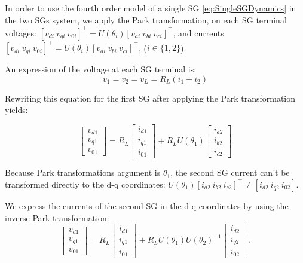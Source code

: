 \documentclass[letterpaper, 10 pt, conference]{ieeeconf}  %
\newcommand{\BE}{\begin{equation}}
\newcommand{\BEQ}[1]{\BE\label{#1}} %
\begin{document}

In order to use the fourth order model of a single SG \eqref{eq:SingleSGDynamics} in the two SGs system, we apply  the Park transformation, on each SG  terminal voltages: $\left[ v_{di}\ v_{qi}\  v_{0i} \right]^\top=U(\theta_{i})\left[v_{ai}\ v_{bi}\ v_{ci}  \right]^\top$,  and currents $\left[v_{di}\ v_{qi}\  v_{0i} \right]^\top=U(\theta_{i})\left[v_{ai}\ v_{bi}\ v_{ci}  \right]^\top$,  ($i \in \{1,2\}$).

An expression of the voltage at each SG terminal is:
$$v_1=v_2=v_L=R_{L}(i_{1}+i_{2})$$

Rewriting this equation for the first SG after applying the Park transformation yields:

$$
\left[\begin{array}{c}
v_{d1}\\
v_{q1}\\
v_{01}
\end{array}\right]=R_{L}\left[\begin{array}{c}
i_{d1}\\
i_{q1}\\
i_{01}
\end{array}\right]+R_{L}U(\theta_{1})\left[\begin{array}{c}
i_{a2}\\
i_{b2}\\
i_{c2}
\end{array}\right]
$$

Because Park transformations argument is  $\theta_1$,  the second SG current can't be transformed directly to the d-q coordinates:   $U(\theta_{1})\left[ i_{a2}\ i_{b2}\ i_{c2}\right]^\top \neq \left[ i_{d2}\ i_{q2}\ i_{02}\right]$. 

We express  the currents of the second SG in the d-q coordinates by using the inverse Park transformation: 
\BEQ{eq:TICSGVolAndCurr}
 \left[\begin{array}{c}
v_{d1}\\
v_{q1}\\
v_{01}
\end{array}\right]=R_{L}\left[\begin{array}{c}
i_{d1}\\
i_{q1}\\
i_{01}
\end{array}\right]+R_{L}U(\theta_{1})U(\theta_{2})^{-1}\left[\begin{array}{c}
i_{d2}\\
i_{q2}\\
i_{02}
\end{array}\right].
\end{equation}
\end{document}
